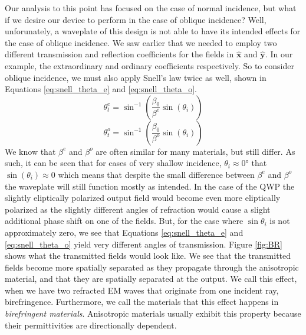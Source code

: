 \documentclass{optica-article}
\newcommand{\bv}[1]{\mathbf{#1}}
\begin{document}
Our analysis to this point has focused on the case of normal incidence, but
what if we desire our device to perform in the case of oblique incidence?
Well, unforunately, a waveplate of this design is not able to have its 
intended effects for the case of oblique incidence. We saw earlier that 
we needed to employ two different transmission and reflection coefficients
for the fields in $\bv{\hat{x}}$ and $\bv{\hat{y}}$. In our example, the 
extraordinary and ordinary coefficients respectively. So to consider oblique
incidence, we must also apply Snell's law twice as well, shown in Equations 
\eqref{eq:snell_theta_e} and \eqref{eq:snell_theta_o}.
\begin{equation}\label{eq:snell_theta_e}
  \theta^e_t = \sin^{-1}\left(\frac{\beta_0}{\beta^e}\sin(\theta_i)\right)
\end{equation}
\begin{equation}\label{eq:snell_theta_o}
  \theta^o_t = \sin^{-1}\left(\frac{\beta_0}{\beta^o}\sin(\theta_i)\right)
\end{equation}
We know that $\beta^e$ and $\beta^o$ are often similar for many materials, but
still differ. As such, it can be seen that for cases of very shallow incidence,
$\theta_i \approx \ang{0}$
that $\sin(\theta_i) \approx 0$ which means that despite the small difference
between $\beta^e$ and $\beta^o$ the waveplate will still function mostly as
intended. In the case of the QWP the slightly eliptically polarized output
field would become even more eliptically polarized as the slightly different
angles of refraction would cause a slight additional phase shift on one of the
fields. But, for the case where $\sin{\theta_i}$ is not approximately zero,
we see that Equations \eqref{eq:snell_theta_e} and \eqref{eq:snell_theta_o}
yield very different angles of transmission. Figure \ref{fig:BR} shows what
the transmitted fields would look like. We see that the transmitted fields
become more spatially separated as they propagate through the anisotropic
material, and that they are spatially separated at the output.
We call this effect, when we have two 
refracted EM waves that originate from one incident ray, birefringence. 
Furthermore, we call the materials that this effect happens in 
\textit{birefringent materials}. Anisotropic materials usually exhibit this 
property because their permittivities are directionally dependent.
\end{document}

